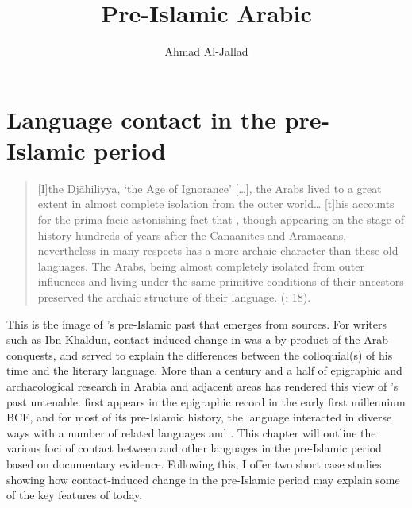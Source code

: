 \documentclass[output=paper]{langsci/langscibook}
\author{Ahmad Al-Jallad\affiliation{The Ohio State University}}
\title{Pre-Islamic Arabic}
\begin{document}
  
\section{Language contact in the pre-Islamic period}

\begin{quote}
[I]the Djāhiliyya, ‘the Age of Ignorance’ […], the Arabs lived to a great extent in almost complete isolation from the outer world… [t]his accounts for the prima facie astonishing fact that , though appearing on the stage of history hundreds of years after the Canaanites and Aramaeans, nevertheless in many respects has a more archaic character than these old  languages. The Arabs, being almost completely isolated from outer influences and living under the same primitive conditions of their ancestors preserved the archaic structure of their language. (\citealt{Blau1981}: 18).
\end{quote}
This is the image of ’s pre-Islamic past that emerges from   sources. For writers such as Ibn Khaldūn, contact-induced change in  was a by-product of the Arab conquests, and served to explain the differences between the colloquial(s) of his time and the literary language. More than a century and a half of epigraphic and archaeological research in Arabia and adjacent areas has rendered this view of ’s past untenable.  first appears in the epigraphic record in the early first millennium BCE, and for most of its pre-Islamic history, the language interacted in diverse ways with a number of related  languages and . This chapter will outline the various foci of contact between  and other languages in the pre-Islamic period based on documentary evidence. Following this, I offer two short case studies showing how contact-induced change in the pre-Islamic period may explain some of the key features of  today.   
\end{document}
